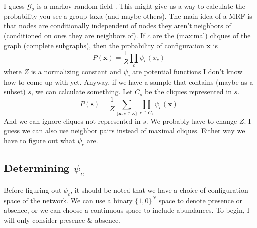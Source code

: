 \documentclass[10pt]{article}
\theoremstyle{definition}
\numberwithin{theorem}{section}
\numberwithin{definition}{section}
\numberwithin{lemma}{section}
\numberwithin{corollary}{section}
\numberwithin{clm}{section}
\numberwithin{rmk}{section}
\renewcommand{\b}{\bm}
\newcommand{\cG}{\mathcal{G}}
\begin{document}
I guess $\cG_2$ is a markov random field \cite{machine_learning}. This might give us a way to calculate the probability you see a group taxa (and maybe others). The main idea of a MRF is that nodes are conditionally independent of nodes they aren't neighbors of (conditioned on ones they are neighbors of). If $c$ are the (maximal) cliques of the graph (complete subgraphs), then the probability of configuration $\b{x}$ is
\[
P(\b{x}) = \frac{1}{Z} \prod_{c} \psi_c (x_{c})
\]	
where $Z$ is a normalizing constant and $\psi_c$ are potential functions I don't know how to come up with yet. Anyway, if we have a sample that contains (maybe as a subset) $s$, we can calculate something. Let $C_s$ be the cliques represented in $s$.
\[
P(\b{s}) = \frac{1}{Z}\sum_{\{\b{x} : s\subset \b{x}\}}\prod_{c\in C_s}\psi_c(\b{x})
\]
And we can ignore cliques not represented in $s$. We probably have to change $Z$. I guess we can also use neighbor pairs instead of maximal cliques. Either way we have to figure out what $\psi_c$ are.

\subsection{Determining $\psi_c$}

Before figuring out $\psi_c$, it should be noted that we have a choice of configuration space of the network. We can use a binary $\{1,0\}^N$ space to denote presence or absence, or we can choose a continuous space to include abundances. To begin, I will only consider presence \& absence.
	
\end{document}
